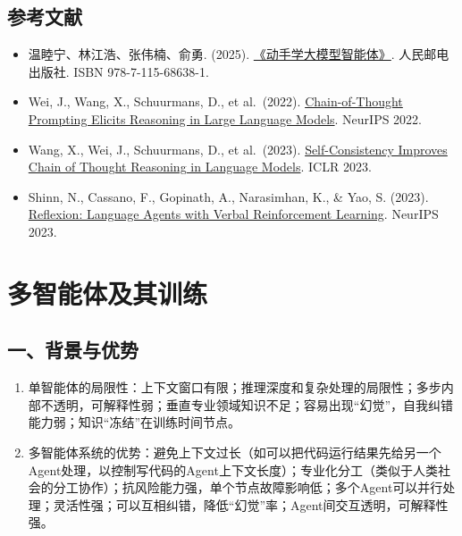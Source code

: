 \hypertarget{ux53c2ux8003ux6587ux732e-115}{%
\subsection{参考文献}\label{ux53c2ux8003ux6587ux732e-115}}

\vspace{0.25em}
\begin{itemize}
\tightlist
\item
  温睦宁、林江浩、张伟楠、俞勇. (2025). \href{https://haa.boyuai.com/}{《动手学大模型智能体》}. 人民邮电出版社. ISBN 978-7-115-68638-1.
\item
  Wei, J., Wang, X., Schuurmans, D., et al.~(2022). \href{https://arxiv.org/abs/2201.11903}{Chain-of-Thought Prompting Elicits Reasoning in Large Language Models}. NeurIPS 2022.
\item
  Wang, X., Wei, J., Schuurmans, D., et al.~(2023). \href{https://openreview.net/forum?id=1PL1NIMMrw}{Self-Consistency Improves Chain of Thought Reasoning in Language Models}. ICLR 2023.
\item
  Shinn, N., Cassano, F., Gopinath, A., Narasimhan, K., \& Yao, S. (2023). \href{https://arxiv.org/abs/2303.11366}{Reflexion: Language Agents with Verbal Reinforcement Learning}. NeurIPS 2023.
\end{itemize}

\clearpage

\hypertarget{ux591aux667aux80fdux4f53ux53caux5176ux8badux7ec3}{%
\section{多智能体及其训练}\label{ux591aux667aux80fdux4f53ux53caux5176ux8badux7ec3}}

\hypertarget{ux4e00ux80ccux666fux4e0eux4f18ux52bf}{%
\subsection{一、背景与优势}\label{ux4e00ux80ccux666fux4e0eux4f18ux52bf}}

\begin{enumerate}
\def\labelenumi{\arabic{enumi}.}
\item
  单智能体的局限性：上下文窗口有限；推理深度和复杂处理的局限性；多步内部不透明，可解释性弱；垂直专业领域知识不足；容易出现``幻觉''，自我纠错能力弱；知识``冻结''在训练时间节点。
\item
  多智能体系统的优势：避免上下文过长（如可以把代码运行结果先给另一个Agent处理，以控制写代码的Agent上下文长度）；专业化分工（类似于人类社会的分工协作）；抗风险能力强，单个节点故障影响低；多个Agent可以并行处理；灵活性强；可以互相纠错，降低``幻觉''率；Agent间交互透明，可解释性强。
\end{enumerate}

